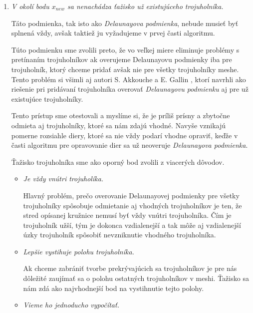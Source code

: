 \begin{enumerate}
     \item{
         \textit{V okolí bodu $x_{new}$ sa nenachádza ťažisko už existujúceho trojuholníka.}

         Táto podmienka, tak isto ako \textit{Delaunayova podmienka}, nebude musieť byť splnená vždy,
         avšak taktiež ju vyžadujeme v prvej časti algoritmu. 
         
         Túto podmienku sme zvolili preto, že vo veľkej miere eliminuje problémy s pretínaním 
         trojuholníkov ak overujeme Delaunayovu podmienky iba pre trojuholník, ktorý chceme pridať 
         avšak nie pre všetky trojuholníky meshe. Tento problém si všimli aj autori S. Akkouche a 
         E. Gallin \cite{akkouche2001adaptive}, ktorí navrhli ako riešenie pri pridávaní trojuholníka 
         overovať \textit{Delaunayovu podmienku} aj pre už existujúce trojuholníky. 
         
         Tento prístup sme otestovali a myslíme si, že je príliš prísny a zbytočne odmieta aj trojuholníky, 
         ktoré sa nám zdajú vhodné. Navyše vznikajú pomerne rozsiahle diery, ktoré sa nie vždy podarí 
         vhodne opraviť, keďže v časti algoritmu pre opravovanie dier sa už neoveruje
         \textit{Delaunayova podmienka}.

         Ťažisko trojuholníka sme ako oporný bod zvolili z viacerých dôvodov.
         \begin{itemize}
            \item{
                \textit{Je vždy vnútri trojuholíka.}

                Hlavný problém, prečo overovanie Delaunayovej podmienky pre všetky trojuholníky spôsobuje
                odmietanie aj vhodných trojuholníkov je ten, že stred opísanej kružnice nemusí byť vždy
                vnútri trojuholníka. Čím je trojuholník užší, tým je dokonca vzdialenejší a tak môže aj
                vzdialenejší úzky trojuholník spôsobiť nevzniknutie vhodného trojuholníka. 
            }
            \item{
                \textit{Lepšie vystihuje polohu trojuholníka.}

                Ak chceme zabrániť tvorbe prekrývajúcich sa trojuholníkov je pre nás dôležité zaujímať sa 
                o polohu ostatných trojuholníkov v meshi. Ťažisko sa nám zdá ako najvhodnejší bod na 
                vystihnutie tejto polohy.
            }
            \item{
                \textit{Vieme ho jednoducho vypočítať.}

}
\end{itemize}}
\end{enumerate}
